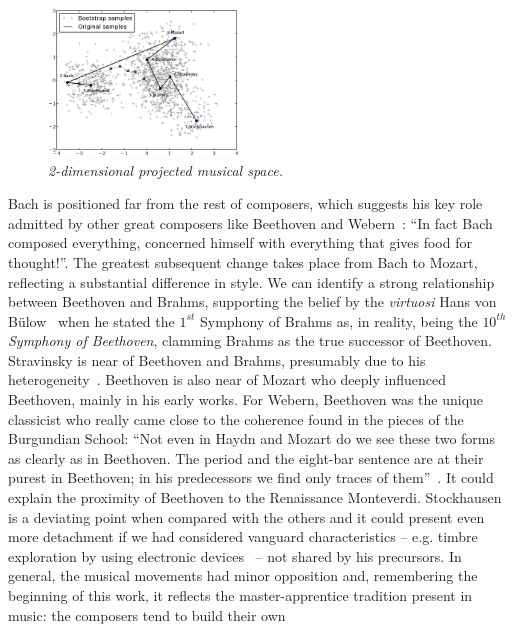 \documentclass[
 aip,
 jmp,
 amsmath,amssymb,
 reprint,
]{revtex4-1}
\begin{document}
\begin{figure}[htbp]
  \begin{center}
    \includegraphics[width=0.45\textwidth]{g1}
  \end{center}
  \caption{\it 2-dimensional projected musical space.}
  \label{fig:pca}
\end{figure}

Bach is positioned far from the rest of
composers, which suggests his key role
admitted by other great composers like Beethoven and
Webern~\cite{Webern}: ``In fact Bach composed everything, concerned
himself with everything that gives food for thought!''. 
The greatest subsequent change takes place from Bach to Mozart,
reflecting a substantial difference in style.
We can identify a strong relationship between
Beethoven and Brahms, supporting the belief by the \textit{virtuosi} Hans von B\"{u}low~\cite{Bulow} when he
stated the $1^{st}$ Symphony of Brahms as, in reality, being the \textit{$10^{th}$ Symphony of
Beethoven}, clamming Brahms as the true successor of
Beethoven. Stravinsky is near of Beethoven and Brahms,
presumably due to his heterogeneity~\cite{BennettHistory,
  Lovelock}. Beethoven is also near of Mozart who deeply influenced
Beethoven, mainly in his early works.
For Webern, Beethoven was the unique classicist who really came close
to the coherence found in the pieces of the Burgundian School: ``Not even
in Haydn and Mozart do we see these two forms as clearly as in
Beethoven. The period and the eight-bar sentence are at their purest
in Beethoven; in his predecessors we find only traces of them''~\cite{Webern}. It
could explain the proximity of Beethoven to the Renaissance  Monteverdi.
Stockhausen is a deviating point when compared with the others and it
could present even more detachment if we had considered
vanguard characteristics -- e.g. timbre exploration by using
electronic devices~\cite{Lovelock} -- not
shared by his precursors.
In general, the musical movements had minor opposition and,
remembering the beginning of this work, it reflects the
master-apprentice
tradition present in music: the composers tend to build their own
\end{document}
